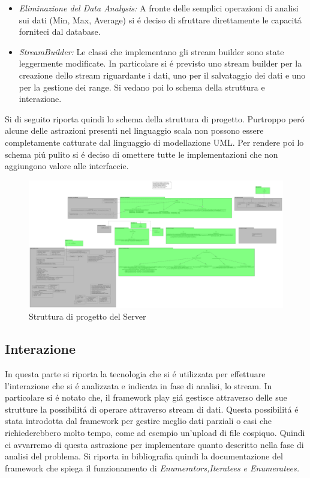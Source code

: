 \begin{itemize}
  \item \textit{Eliminazione del Data Analysis:} A fronte delle semplici operazioni di analisi sui dati (Min, Max, Average) si \'e deciso di sfruttare direttamente le capacit\'a forniteci dal database.
  \item \textit{StreamBuilder:} Le classi che implementano gli stream builder sono state leggermente modificate. In particolare si \'e previsto uno stream builder per la creazione dello stream riguardante i dati, uno per il salvataggio dei dati e uno per la gestione dei range. Si vedano poi lo schema della struttura e interazione.
\end{itemize}

Si di seguito riporta quindi lo schema della struttura di progetto. Purtroppo per\'o alcune delle astrazioni presenti nel linguaggio scala non possono essere completamente catturate dal linguaggio di modellazione UML. Per rendere poi lo schema pi\'u pulito si \'e deciso di omettere tutte le implementazioni che non aggiungono valore alle interfaccie.

\begin{figure}
\centering
\includegraphics[scale=0.1]{Figures/Project/Server/Structure/DomoticRoomServerClassDiagram}
\caption{Struttura di progetto del Server}
\end{figure}

\afterpage{\clearpage}

\newpage

\subsection{Interazione}

In questa parte si riporta la tecnologia che si \'e utilizzata per effettuare l'interazione che si \'e analizzata e indicata in fase di analisi, lo stream. In particolare si \'e notato che, il framework play\cite{PlayFramework} gi\'a gestisce attraverso delle sue strutture la possibilit\'a di operare attraverso stream di dati. Questa possibilit\'a \'e stata introdotta dal framework per gestire meglio dati parziali o casi che richiederebbero molto tempo, come ad esempio un'upload di file cospiquo. Quindi ci avvarremo di questa astrazione per implementare quanto descritto nella fase di analisi del problema. Si riporta in bibliografia quindi la documentazione del framework che spiega il funzionamento di \textit{Enumerators,Iteratees e Enumeratees.} \cite{PlayStreaming}

